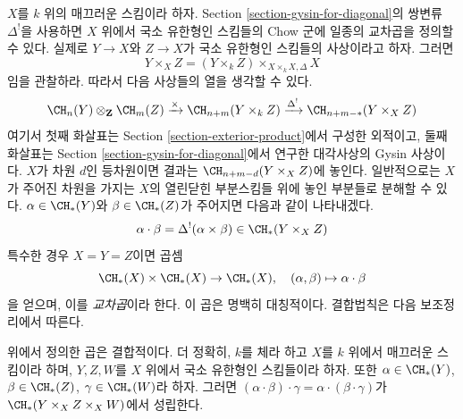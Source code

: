 \medskip\noindent
$X$를 $k$ 위의 매끄러운 스킴이라 하자. Section
\ref{section-gysin-for-diagonal}의 쌍변류 $\Delta^!$을 사용하면
$X$ 위에서 국소 유한형인 스킴들의 Chow 군에 일종의 교차곱을 정의할
수 있다. 실제로 $Y \to X$와 $Z \to X$가 국소 유한형인 스킴들의
사상이라고 하자. 그러면
$$
Y \times_X Z =  (Y \times_k Z) \times_{X \times_k X, \Delta} X
$$
임을 관찰하라. 따라서 다음 사상들의 열을 생각할 수 있다.
$$
\CH_n(Y) \otimes_\mathbf{Z} \CH_m(Z)
\xrightarrow{\times}
\CH_{n + m}(Y \times_k Z)
\xrightarrow{\Delta^!}
\CH_{n + m - *}(Y \times_X Z)
$$
여기서 첫째 화살표는 Section \ref{section-exterior-product}에서 구성한
외적이고, 둘째 화살표는 Section \ref{section-gysin-for-diagonal}에서
연구한 대각사상의 Gysin 사상이다. $X$가 차원 $d$인 등차원이면
결과는 $\CH_{n + m - d}(Y \times_X Z)$에 놓인다. 일반적으로는
$X$가 주어진 차원을 가지는 $X$의 열린닫힌 부분스킴들 위에 놓인 부분들로
분해할 수 있다. $\alpha \in \CH_*(Y)$와 $\beta \in \CH_*(Z)$가
주어지면 다음과 같이 나타내겠다.
$$
\alpha \cdot \beta = \Delta^!(\alpha \times \beta)
\in \CH_*(Y \times_X Z)
$$
특수한 경우 $X = Y = Z$이면 곱셈
$$
\CH_*(X) \times \CH_*(X) \to \CH_*(X),\quad
(\alpha, \beta) \mapsto \alpha \cdot \beta
$$
을 얻으며, 이를 {\it 교차곱}이라 한다. 이 곱은 명백히 대칭적이다.
결합법칙은 다음 보조정리에서 따른다.

\begin{lemma}
\label{lemma-associative}
위에서 정의한 곱은 결합적이다. 더 정확히, $k$를 체라 하고 $X$를
$k$ 위에서 매끄러운 스킴이라 하며, $Y, Z, W$를 $X$ 위에서 국소
유한형인 스킴들이라 하자. 또한
$\alpha \in \CH_*(Y)$, $\beta \in \CH_*(Z)$,
$\gamma \in \CH_*(W)$라 하자. 그러면
$(\alpha \cdot \beta) \cdot \gamma =
\alpha \cdot (\beta \cdot \gamma)$가
$\CH_*(Y \times_X Z \times_X W)$에서 성립한다.
\end{lemma}

